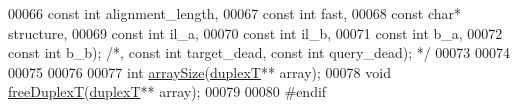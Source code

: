 \begin{DoxyCode}
00066                           \textcolor{keyword}{const} \textcolor{keywordtype}{int} alignment\_length,
00067                           \textcolor{keyword}{const} \textcolor{keywordtype}{int} fast,
00068                           \textcolor{keyword}{const} \textcolor{keywordtype}{char}* structure,
00069                           \textcolor{keyword}{const} \textcolor{keywordtype}{int} il\_a,
00070                           \textcolor{keyword}{const} \textcolor{keywordtype}{int} il\_b,
00071                           \textcolor{keyword}{const} \textcolor{keywordtype}{int} b\_a,
00072                           \textcolor{keyword}{const} \textcolor{keywordtype}{int} b\_b); \textcolor{comment}{/*, const int target\_dead, const int query\_dead); */}
00073 
00074 
00075 
00076 
00077 \textcolor{keywordtype}{int}      \mbox{\hyperlink{plex_8h_ae867a9c0aaca9d6913498f4bbf15d38e}{arraySize}}(\mbox{\hyperlink{group__data__structures_structduplex_t}{duplexT}}** array);
00078 \textcolor{keywordtype}{void}     \mbox{\hyperlink{plex_8h_a78997af137c826fb0eedb201bfc6ec4a}{freeDuplexT}}(\mbox{\hyperlink{group__data__structures_structduplex_t}{duplexT}}** array);
00079 
00080 \textcolor{preprocessor}{#endif}
\end{DoxyCode}
